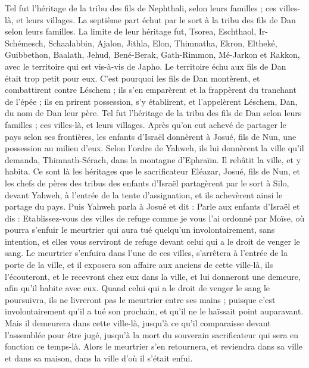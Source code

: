\begin{multicols}{2}
Tel fut l’héritage de la tribu des fils de Nephthali, selon leurs familles ; ces villes-là, et leurs villages.
La septième part échut par le sort à la tribu des fils de Dan selon leurs familles.
La limite de leur héritage fut, Tsorea, Eschthaol, Ir-Schémesch,
Schaalabbin, Ajalon, Jithla,
Elon, Thimnatha, Ekron,
Eltheké, Guibbethon, Baalath,
Jehud, Bené-Berak, Gath-Rimmon,
Mé-Jarkon et Rakkon, avec le territoire qui est vis-à-vis de Japho.
Le territoire échu aux fils de Dan était trop petit pour eux. C’est pourquoi les fils de Dan montèrent, et combattirent contre Léschem ; ils s’en emparèrent et la frappèrent du tranchant de l’épée ; ils en prirent possession, s’y établirent, et l’appelèrent Léschem, Dan, du nom de Dan leur père.
Tel fut l’héritage de la tribu des fils de Dan selon leurs familles ; ces villes-là, et leurs villages.
Après qu’on eut achevé de partager le pays selon ses frontières, les enfants d’Israël donnèrent à Josué, fils de Nun, une possession au milieu d’eux.
Selon l’ordre de Yahweh, ils lui donnèrent la ville qu’il demanda, Thimnath-Sérach, dans la montagne d’Ephraïm. Il rebâtit la ville, et y habita.
Ce sont là les héritages que le sacrificateur Eléazar, Josué, fils de Nun, et les chefs de pères des tribus des enfants d’Israël partagèrent par le sort à Silo, devant Yahweh, à l’entrée de la tente d’assignation, et ils achevèrent ainsi le partage du pays.
\VerseOne{}Puis Yahweh parla à Josué et dit :
Parle aux enfants d’Israël et dis : Etablissez-vous des villes de refuge comme je vous l’ai ordonné par Moïse,
où pourra s’enfuir le meurtrier qui aura tué quelqu’un involontairement, sans intention, et elles vous serviront de refuge devant celui qui a le droit de venger le sang.
Le meurtrier s’enfuira dans l’une de ces villes, s’arrêtera à l’entrée de la porte de la ville, et il exposera son affaire aux anciens de cette ville-là, ils l’écouteront, et le recevront chez eux dans la ville, et lui donneront une demeure, afin qu’il habite avec eux.
Quand celui qui a le droit de venger le sang le poursuivra, ils ne livreront pas le meurtrier entre ses mains ; puisque c’est involontairement qu’il a tué son prochain, et qu’il ne le haïssait point auparavant.
Mais il demeurera dans cette ville-là, jusqu’à ce qu’il comparaisse devant l’assemblée pour être jugé, jusqu’à la mort du souverain sacrificateur qui sera en fonction ce temps-là. Alors le meurtrier s’en retournera, et reviendra dans sa ville et dans sa maison, dans la ville d’où il s’était enfui.

\end{multicols}
